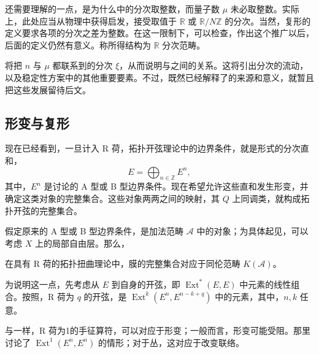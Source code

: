 还需要理解的一点，是为什么中的分次取整数，而量子数 $\mu$ 未必取整数。实际上，此处应当从物理中获得启发，接受取值于 $\mathbb{R}$ 或 $\mathbb{R}/N\mathbb{Z}$ 的分次。当然，复形的定义要求各项的分次之差为整数。在这一限制下，可以检查，作出这个推广以后，后面的定义仍然有意义。称所得结构为 $\mathbb{R}$ 分次范畴。

将把 $n$ 与 $\mu$ 都联系到的分次 $\xi$，从而说明与之间的关系。这将引出分次的流动，以及稳定性方案中的其他重要要素。不过，既然已经解释了的来源和意义，就暂且把这些发展留待后文。

\subsection{形变与复形}\label{sec:5.3.2}

现在已经看到，一旦计入 R 荷，拓扑开弦理论中的边界条件，就是形式的分次直和，
\begin{equation}\label{eq:5.42}
E=\bigoplus_{n\in\mathbb{Z}}E^n,
\end{equation}
其中，$E^n$ 是讨论的 A 型或 B 型边界条件。现在希望允许这些直和发生形变，并确定这类对象的完整集合。这些对象两两之间的映射，其 $Q$ 上同调类，就构成拓扑开弦的完整集合。

假定原来的 A 型或 B 型边界条件，是加法范畴 $\mathcal{A}$ 中的对象；为具体起见，可以考虑 $X$ 上的局部自由层。那么，
\begin{proposition}\label{prop:5.10}
在具有 R 荷的拓扑扭曲理论中，膜的完整集合对应于同伦范畴 $K(\mathcal{A})$。
\end{proposition}

为说明这一点，先考虑从 $E$ 到自身的开弦，即 $\operatorname{Ext}^*(E,E)$ 中元素的线性组合。按照，R 荷为 $q$ 的开弦，是 $\operatorname{Ext}^k(E^n,E^{n-k+q})$ 中的元素，其中，$n,k$ 任意。

与一样，R 荷为1的手征算符，可以对应于形变；一般而言，形变可能受阻。那里讨论了 $\operatorname{Ext}^1(E^n,E^n)$ 的情形；对于丛，这对应于改变联络。

